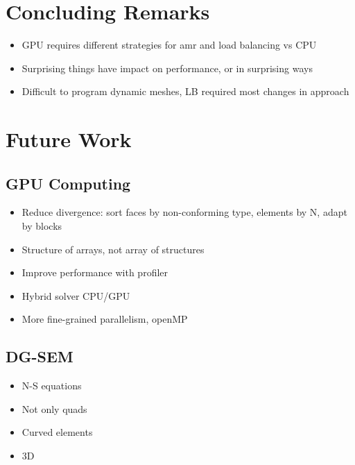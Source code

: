 \section{Concluding Remarks}\label{section:conclusion:remarks}

\begin{itemize}
    \item GPU requires different strategies for amr and load balancing vs CPU
    \item Surprising things have impact on performance, or in surprising ways
    \item Difficult to program dynamic meshes, LB required most changes in approach
\end{itemize}

\section{Future Work}\label{section:conclusion:future_work}

\subsection{GPU Computing}\label{subsection:conclusion:future_work:gpu}

\begin{itemize}
    \item Reduce divergence: sort faces by non-conforming type, elements by N, adapt by blocks
    \item Structure of arrays, not array of structures
    \item Improve performance with profiler
    \item Hybrid solver CPU/GPU
    \item More fine-grained parallelism, openMP
\end{itemize}

\subsection{DG-SEM}\label{subsection:conclusion:future_work:dg_sem}

\begin{itemize}
    \item N-S equations
    \item Not only quads
    \item Curved elements
    \item 3D
\end{itemize}

